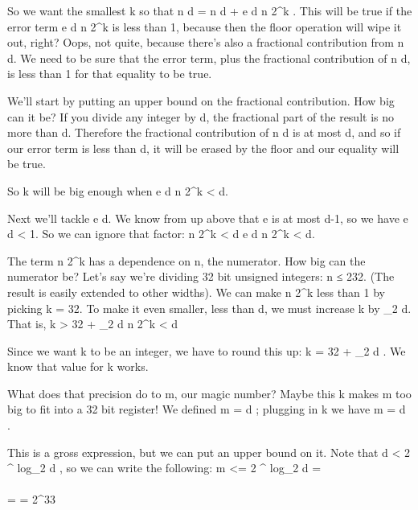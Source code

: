 So we want the smallest k so that \lfloor \frac n d \rfloor = \lfloor \frac n d + \frac e d \times \frac n {2^k} \rfloor . This will be true if the error term \frac e d \times \frac n {2^k} is less than 1, because then the floor operation will wipe it out, right? Oops, not quite, because there’s also a fractional contribution from \frac n d. We need to be sure that the error term, plus the fractional contribution of \frac n d, is less than 1 for that equality to be true.

We’ll start by putting an upper bound on the fractional contribution. How big can it be? If you divide any integer by d, the fractional part of the result is no more than  d. Therefore the fractional contribution of \frac n d is at most  d, and so if our error term is less than  d, it will be erased by the floor and our equality will be true.

So k will be big enough when   \frac e d \times \frac n {2^k} <  d.

Next we’ll tackle \frac e d. We know from up above that e is at most d-1, so we have \frac e d < 1. So we can ignore that factor: \frac n {2^k} <  d \implies \frac e d \times \frac n {2^k} <  d.

The term \frac n {2^k} has a dependence on n, the numerator. How big can the numerator be? Let’s say we’re dividing 32 bit unsigned integers: n ≤ 232. (The result is easily extended to other widths). We can make \frac n {2^k} less than 1 by picking k = 32. To make it even smaller, less than  d, we must increase k by \log_2 d. That is,
k > 32 + \log_2 d \implies \frac n {2^k} <  d

Since we want k to be an integer, we have to round this up: k = 32 + \lceil \log_2 d \rceil. We know that value for k works.

What does that precision do to m, our magic number? Maybe this k makes m too big to fit into a 32 bit register! We defined m = \lceil {} d \rceil; plugging in k we have m = \lceil {} d \rceil .

This is a gross expression, but we can put an upper bound on it. Note that d < {2 ^ { \lceil log_2 d \rceil } }, so we can write the following:
m <= \lceil {} {2 ^ { \lfloor log_2 d \rfloor } } \rceil =  \rceil \\ \\ =  \rceil = 2^{33}

